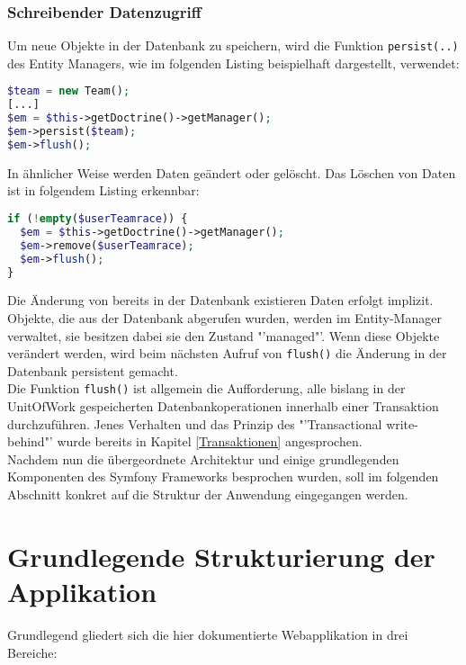 \documentclass[12pt]{report}
\begin{document}
\subsubsection{Schreibender Datenzugriff}
Um neue Objekte in der Datenbank zu speichern, wird die Funktion \texttt{persist(..)} des Entity Managers, wie im folgenden Listing beispielhaft dargestellt, verwendet:
\begin{lstlisting}[language=php, caption=Auszug aus \\src/TeamRace/WebBundle/Controller/TeamraceController.php, showstringspaces=false]
$team = new Team();
[...]    	
$em = $this->getDoctrine()->getManager();
$em->persist($team);
$em->flush();
\end{lstlisting}
In ähnlicher Weise werden Daten geändert oder gelöscht. Das Löschen von Daten ist in folgendem Listing erkennbar:
\begin{lstlisting}[language=php, caption=Auszug aus \\src/TeamRace/WebBundle/Controller/TeamraceController.php, showstringspaces=false]
if (!empty($userTeamrace)) {
  $em = $this->getDoctrine()->getManager();
  $em->remove($userTeamrace);
  $em->flush();
}
\end{lstlisting}
Die Änderung von bereits in der Datenbank existieren Daten erfolgt implizit. Objekte, die aus der Datenbank abgerufen wurden, werden im Entity-Manager verwaltet, sie besitzen dabei sie den Zustand "'managed"'. Wenn diese Objekte verändert werden, wird beim nächsten Aufruf von \texttt{flush()} die Änderung in der Datenbank persistent gemacht.\\

Die Funktion \texttt{flush()} ist allgemein die Aufforderung, alle bislang in der UnitOfWork gespeicherten Datenbankoperationen innerhalb einer Transaktion durchzuführen. Jenes Verhalten und das Prinzip des "'Transactional write-behind"' wurde bereits in Kapitel \ref{Transaktionen} angesprochen.\\

Nachdem nun die übergeordnete Architektur und einige grundlegenden Komponenten des Symfony Frameworks besprochen wurden, soll im folgenden Abschnitt konkret auf die Struktur der Anwendung eingegangen werden.

\section{Grundlegende Strukturierung der Applikation}

Grundlegend gliedert sich die hier dokumentierte Webapplikation in drei Bereiche: 
\end{document}
